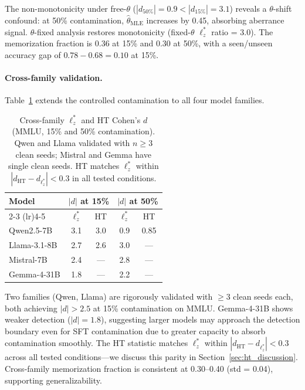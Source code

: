 \documentclass[11pt,a4paper]{article}
\begin{document}
The non-monotonicity under free-$\theta$ ($|d_{50\%}| = 0.9 < |d_{15\%}| = 3.1$) reveals a $\theta$-shift confound: at 50\% contamination, $\hat\theta_{\text{MLE}}$ increases by 0.45, absorbing aberrance signal. $\theta$-fixed analysis restores monotonicity (fixed-$\theta$ $\ell_z^*$ ratio = 3.0). The memorization fraction is 0.36 at 15\% and 0.30 at 50\%, with a seen/unseen accuracy gap of $0.78 - 0.68 = 0.10$ at 15\%.

\paragraph{Cross-family validation.}

Table~\ref{tab:cross_family} extends the controlled contamination to all four model families.

\begin{table}[t]
\centering
\small
\begin{tabular}{lcccc}
\toprule
\textbf{Model} & \multicolumn{2}{c}{\textbf{$|d|$ at 15\%}} & \multicolumn{2}{c}{\textbf{$|d|$ at 50\%}} \\
\cmidrule(lr){2-3} \cmidrule(lr){4-5}
 & $\ell_z^*$ & HT & $\ell_z^*$ & HT \\
\midrule
Qwen2.5-7B & 3.1 & 3.0 & 0.9 & 0.85 \\
Llama-3.1-8B & 2.7 & 2.6 & 3.0 & --- \\
Mistral-7B & 2.4 & --- & 2.8 & --- \\
Gemma-4-31B & 1.8 & --- & 2.2 & --- \\
\bottomrule
\end{tabular}
\caption{Cross-family $\ell_z^*$ and HT Cohen's $d$ (MMLU, 15\% and 50\% contamination). Qwen and Llama validated with $n \geq 3$ clean seeds; Mistral and Gemma have single clean seeds. HT matches $\ell_z^*$ within $|d_{\text{HT}} - d_{\ell_z^*}| < 0.3$ in all tested conditions.}
\label{tab:cross_family}
\end{table}

Two families (Qwen, Llama) are rigorously validated with $\geq$3 clean seeds each, both achieving $|d| > 2.5$ at 15\% contamination on MMLU. Gemma-4-31B shows weaker detection ($|d| = 1.8$), suggesting larger models may approach the detection boundary even for SFT contamination due to greater capacity to absorb contamination smoothly. The HT statistic matches $\ell_z^*$ within $|d_{\text{HT}} - d_{\ell_z^*}| < 0.3$ across all tested conditions---we discuss this parity in Section~\ref{sec:ht_discussion}. Cross-family memorization fraction is consistent at 0.30--0.40 (std = 0.04), supporting generalizability.
\end{document}
